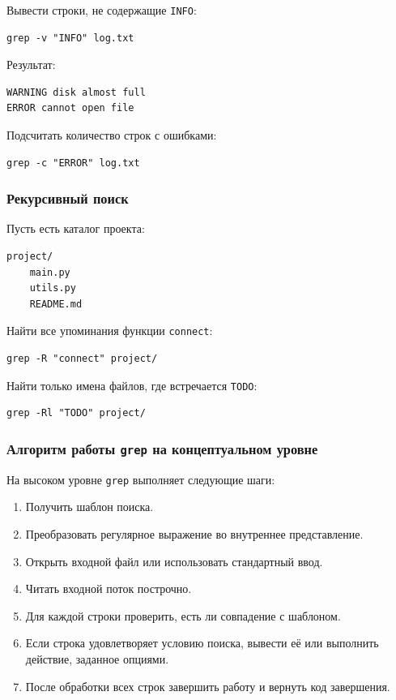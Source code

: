 \documentclass[12pt,a4paper]{article}
\begin{document}
Вывести строки, не содержащие \texttt{INFO}:

\begin{verbatim}
grep -v "INFO" log.txt
\end{verbatim}

Результат:

\begin{verbatim}
WARNING disk almost full
ERROR cannot open file
\end{verbatim}

Подсчитать количество строк с ошибками:

\begin{verbatim}
grep -c "ERROR" log.txt
\end{verbatim}

\subsubsection{Рекурсивный поиск}

Пусть есть каталог проекта:

\begin{verbatim}
project/
    main.py
    utils.py
    README.md
\end{verbatim}

Найти все упоминания функции \texttt{connect}:

\begin{verbatim}
grep -R "connect" project/
\end{verbatim}

Найти только имена файлов, где встречается \texttt{TODO}:

\begin{verbatim}
grep -Rl "TODO" project/
\end{verbatim}

\subsubsection{Алгоритм работы \texttt{grep} на концептуальном уровне}

На высоком уровне \texttt{grep} выполняет следующие шаги:

\begin{enumerate}
    \item Получить шаблон поиска.
    \item Преобразовать регулярное выражение во внутреннее представление.
    \item Открыть входной файл или использовать стандартный ввод.
    \item Читать входной поток построчно.
    \item Для каждой строки проверить, есть ли совпадение с шаблоном.
    \item Если строка удовлетворяет условию поиска, вывести её или выполнить действие, заданное опциями.
    \item После обработки всех строк завершить работу и вернуть код завершения.
\end{enumerate}
\end{document}
